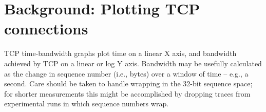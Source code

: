 \documentclass[a4paper,10pt]{article}
\begin{document}
\section*{Background: Plotting TCP connections}

%

TCP time-bandwidth graphs plot time on a linear X axis, and bandwidth
  achieved by TCP on a linear or log Y axis.
  Bandwidth may be usefully calculated as the change in sequence number (i.e.,
  bytes) over a window of time -- e.g., a second.
  Care should be taken to handle wrapping in the 32-bit sequence space; for
  shorter measurements this might be accomplished by dropping traces from
  experimental runs in which sequence numbers wrap.


\end{document}

